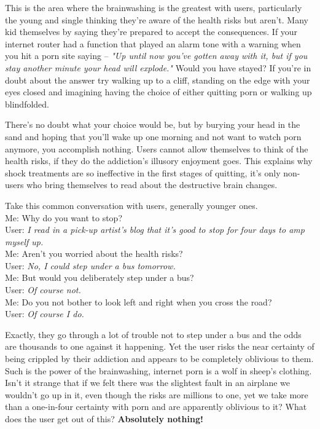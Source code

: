 \documentclass[easypeasy.tex]{subfiles}
\begin{document}
This is the area where the brainwashing is the greatest with users, particularly the young and single thinking they're aware of the health risks but aren't. Many kid themselves by saying they're prepared to accept the consequences. If your internet router had a function that played an alarm tone with a warning when you hit a porn site saying -- \textit{"Up until now you've gotten away with it, but if you stay another minute your head will explode."} Would you have stayed? If you're in doubt about the answer try walking up to a cliff, standing on the edge with your eyes closed and imagining having the choice of either quitting porn or walking up blindfolded.

There's no doubt what your choice would be, but by burying your head in the sand and hoping that you'll wake up one morning and not want to watch porn anymore, you accomplish nothing. Users cannot allow themselves to think of the health risks, if they do the addiction's illusory enjoyment goes. This explains why shock treatments are so ineffective in the first stages of quitting, it's only non-users who bring themselves to read about the destructive brain changes.

Take this common conversation with users, generally younger ones. \\
  Me: Why do you want to stop? \\
  User: \textit{I read in a pick-up artist's blog that it's good to stop for four days to amp myself up.} \\
  Me: Aren't you worried about the health risks? \\
  User: \textit {No, I could step under a bus tomorrow.} \\
  Me: But would you deliberately step under a bus? \\
  User: \textit{Of course not.} \\
  Me: Do you not bother to look left and right when you cross the road? \\
  User: \textit{Of course I do.}

Exactly, they go through a lot of trouble not to step under a bus and the odds are thousands to one against it happening. Yet the user risks the near certainty of being crippled by their addiction and appears to be completely oblivious to them. Such is the power of the brainwashing, internet porn is a wolf in sheep's clothing. Isn't it strange that if we felt there was the slightest fault in an airplane we wouldn't go up in it, even though the risks are millions to one, yet we take more than a one-in-four certainty with porn and are apparently oblivious to it? What does the user get out of this? \textbf{Absolutely nothing!}
\end{document}
